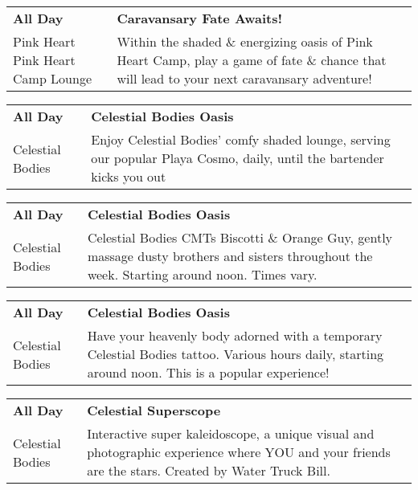 \begin{tabular}{ p{1in} p{2.2in} }
    \textbf{All Day} & \textbf{Caravansary Fate Awaits!} \\
    Pink Heart \newline Pink Heart Camp Lounge & Within the shaded \& energizing oasis of Pink Heart Camp, play a game of fate \& chance that will lead to your next caravansary adventure! \\
    \hline 
\end{tabular}
    
\begin{tabular}{ p{1in} p{2.2in} }
    \textbf{All Day} & \textbf{Celestial Bodies Oasis} \\
    Celestial Bodies \newline  & Enjoy Celestial Bodies' comfy shaded lounge, serving our popular Playa Cosmo, daily, until the bartender kicks you out {\char9786} \\
    \hline 
\end{tabular}
    
\begin{tabular}{ p{1in} p{2.2in} }
    \textbf{All Day} & \textbf{Celestial Bodies Oasis} \\
    Celestial Bodies \newline  & Celestial Bodies CMTs Biscotti \& Orange Guy, gently massage dusty brothers and sisters throughout the week. Starting around noon. Times vary. \\
    \hline 
\end{tabular}
    
\begin{tabular}{ p{1in} p{2.2in} }
    \textbf{All Day} & \textbf{Celestial Bodies Oasis} \\
    Celestial Bodies \newline  & Have your heavenly body adorned with a temporary Celestial Bodies tattoo. Various hours daily, starting around noon. This is a popular experience! \\
    \hline 
\end{tabular}
    
\begin{tabular}{ p{1in} p{2.2in} }
    \textbf{All Day} & \textbf{Celestial Superscope} \\
    Celestial Bodies \newline  & Interactive super kaleidoscope, a unique visual and photographic experience where YOU and your friends are the stars. Created by Water Truck Bill. \\
    \hline 
\end{tabular}
    
